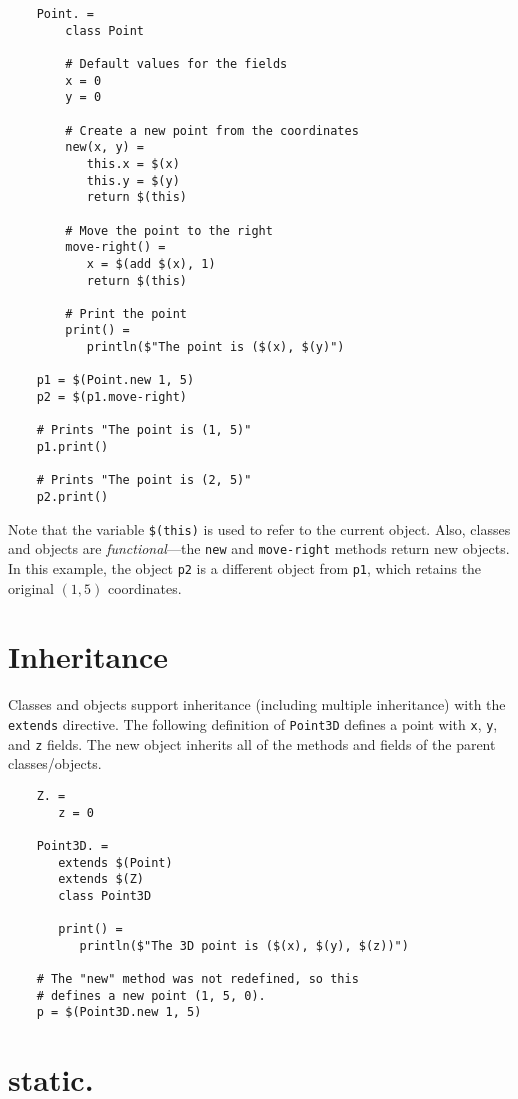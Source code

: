 \begin{verbatim}
    Point. =
        class Point

        # Default values for the fields
        x = 0
        y = 0

        # Create a new point from the coordinates
        new(x, y) =
           this.x = $(x)
           this.y = $(y)
           return $(this)

        # Move the point to the right
        move-right() =
           x = $(add $(x), 1)
           return $(this)

        # Print the point
        print() =
           println($"The point is ($(x), $(y)")

    p1 = $(Point.new 1, 5)
    p2 = $(p1.move-right)

    # Prints "The point is (1, 5)"
    p1.print()

    # Prints "The point is (2, 5)"
    p2.print()
\end{verbatim}

Note that the variable \verb+$(this)+ is used to refer to the current object.  Also, classes and
objects are \emph{functional}---the \verb+new+ and \verb+move-right+ methods return new objects.  In
this example, the object \verb+p2+ is a different object from \verb+p1+, which retains the original
$(1, 5)$ coordinates.

\section{Inheritance}

Classes and objects support inheritance (including multiple inheritance) with the \verb+extends+
directive.  The following definition of \verb+Point3D+ defines a point with \verb+x+, \verb+y+, and
\verb+z+ fields.  The new object inherits all of the methods and fields of the parent classes/objects.

\begin{verbatim}
    Z. =
       z = 0

    Point3D. =
       extends $(Point)
       extends $(Z)
       class Point3D

       print() =
          println($"The 3D point is ($(x), $(y), $(z))")

    # The "new" method was not redefined, so this
    # defines a new point (1, 5, 0).
    p = $(Point3D.new 1, 5)
\end{verbatim}

\section{static.}
\label{section:static.}

